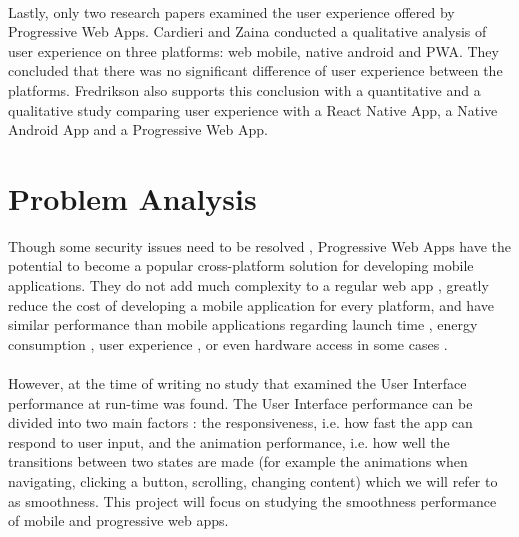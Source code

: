 \documentclass{kththesis}
\begin{document}
\paragraph{}
Lastly, only two research papers examined the user experience offered by Progressive Web Apps. Cardieri and Zaina \cite{PWA_UX_comparison_study} conducted a qualitative analysis of user experience on three platforms: web mobile, native android and PWA. They concluded that there was no significant difference of user experience between the platforms. Fredrikson \cite{emulating_native_w_crossplatform} also supports this conclusion with a quantitative and a qualitative study comparing user experience with a React Native App, a Native Android App and a Progressive Web App. 
\fi


\section{Problem Analysis}


Though some security issues need to be resolved \cite{Pride_Prejudice}, Progressive Web Apps have the potential to become a popular cross-platform solution for developing mobile applications. They do not add much complexity to a regular web app \cite{JohannsenFabian2018PWAa}, greatly reduce the cost of developing a mobile application for every platform, and have similar performance than mobile applications regarding launch time \cite{PWApossibleUnifer}\cite{Biorn-Hansen2} \cite{PWAapplicability}, energy consumption \cite{PWAapplicability}, user experience \cite{emulating_native_w_crossplatform}\cite{PWA_UX_comparison_study}, or even hardware access in some cases \cite{PWAbc_responsetime}. 
\paragraph{}

However, at the time of writing no study that examined the User Interface performance at run-time was found. The User Interface performance can be divided into two main factors : the responsiveness, i.e. how fast the app can respond to user input, and the animation performance, i.e. how well the transitions between two states are made (for example the animations when navigating, clicking a button, scrolling, changing content) which we will refer to as smoothness. This project will focus on studying the smoothness performance of mobile and progressive web apps.
\end{document}
